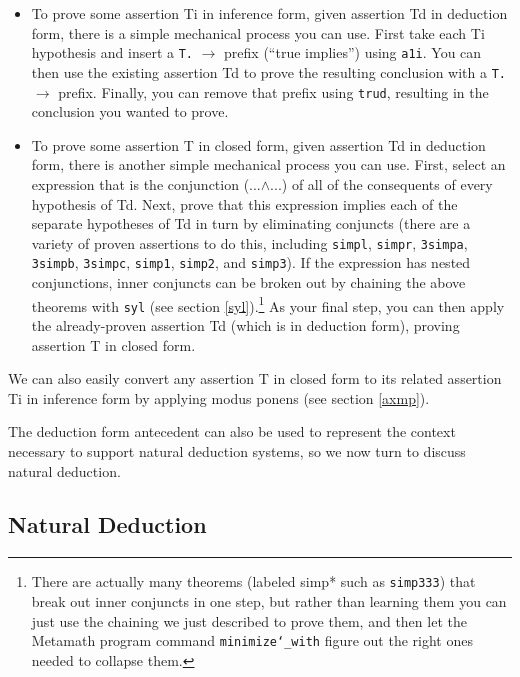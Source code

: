 \begin{itemize}
\item To
prove some assertion Ti in inference form, given assertion Td in deduction
form, there is a simple mechanical process you can use. First take each
Ti hypothesis and insert a \texttt{T.} $\rightarrow$ prefix (``true implies'')
using \texttt{a1i}. You
can then use the existing assertion Td to prove the resulting conclusion
with a \texttt{T.} $\rightarrow$ prefix.
Finally, you can remove that prefix using \texttt{trud},
resulting in the conclusion you wanted to prove.
\item To
prove some assertion T in closed form, given assertion Td in deduction
form, there is another simple mechanical process you can use. First,
select an expression that is the conjunction (...$\land$...) of all of the
consequents of every hypothesis of Td. Next, prove that this expression
implies each of the separate hypotheses of Td in turn by eliminating
conjuncts (there are a variety of proven assertions to do this, including
\texttt{simpl},
\texttt{simpr},
\texttt{3simpa},
\texttt{3simpb},
\texttt{3simpc},
\texttt{simp1},
\texttt{simp2},
and
\texttt{simp3}).
If the
expression has nested conjunctions, inner conjuncts can be broken out by
chaining the above theorems with \texttt{syl}
(see section \ref{syl}).\footnote{
There are actually many theorems
(labeled simp* such as \texttt{simp333}) that break out inner conjuncts in one
step, but rather than learning them you can just use the chaining we
just described to prove them, and then let the Metamath program command
\texttt{minimize{\char`\_}with}
figure out the right ones needed to collapse them.}
As your final step, you can then apply the already-proven assertion Td
(which is in deduction form), proving assertion T in closed form.
\end{itemize}

We can also easily convert any assertion T in closed form to its related
assertion Ti in inference form by applying
modus ponens (see section \ref{axmp}).

The deduction form antecedent can also be used to represent the context
necessary to support natural deduction systems, so we now
turn to discuss natural deduction.

\subsection{Natural Deduction}

